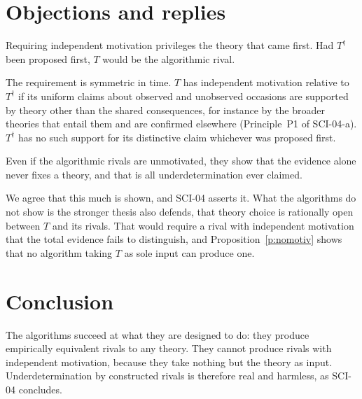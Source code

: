 \documentclass{situationist-preprint}
\begin{document}
\section{Objections and replies}\label{s:objections}

\begin{objection}[Prejudice]
Requiring independent motivation privileges the theory that came first. Had $T^{\dagger}$ been proposed first, $T$ would be the algorithmic rival.
\end{objection}

\begin{reply}
The requirement is symmetric in time. $T$ has independent motivation relative to $T^{\dagger}$ if its uniform claims about observed and unobserved occasions are supported by theory other than the shared consequences, for instance by the broader theories that entail them and are confirmed elsewhere (Principle~P1 of SCI-04-a). $T^{\dagger}$ has no such support for its distinctive claim whichever was proposed first.
\end{reply}

\begin{objection}[Scope]
Even if the algorithmic rivals are unmotivated, they show that the evidence alone never fixes a theory, and that is all underdetermination ever claimed.
\end{objection}

\begin{reply}
We agree that this much is shown, and SCI-04 asserts it. What the algorithms do not show is the stronger thesis \citet{Kukla1998} also defends, that theory choice is rationally open between $T$ and its rivals. That would require a rival with independent motivation that the total evidence fails to distinguish, and Proposition~\ref{p:nomotiv} shows that no algorithm taking $T$ as sole input can produce one.
\end{reply}

\section{Conclusion}\label{s:conclusion}

The algorithms succeed at what they are designed to do: they produce empirically equivalent rivals to any theory. They cannot produce rivals with independent motivation, because they take nothing but the theory as input. Underdetermination by constructed rivals is therefore real and harmless, as SCI-04 concludes.
\end{document}
